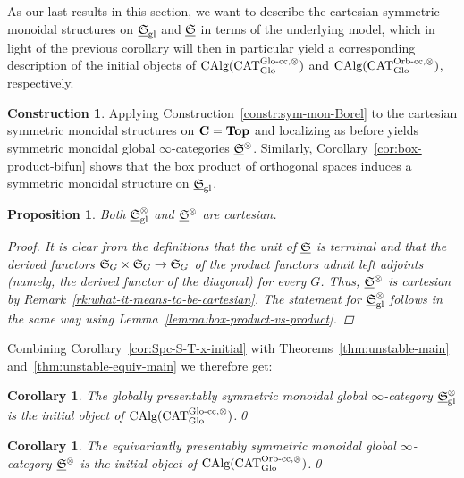 \documentclass[reqno]{memo-l}
\theoremstyle{mythm}
\newtheorem{cor}[thm]{Corollary}
\newtheorem{prop}[thm]{Proposition}
\theoremstyle{definition}
\newtheorem{constr}[thm]{Construction}
\numberwithin{equation}{section}
\newcommand{\gl}{\textup{gl}}
\DeclareMathOperator{\CAT}{CAT}
\newcommand{\cat}[1]{\textbf{\textup{#1}}}
\DeclareMathOperator{\CAlg}{\textup{CAlg}}
\newcommand{\Orb}{{\vphantom{\textup{t}}\smash{\textup{Orb}}}}
\newcommand{\Glo}{\textup{Glo}}
\newcommand{\ulhelper}[2]{\underline{\setbox0=\hbox{$#1#2$}\dp0=0.4pt \box0\relax}}
\newcommand{\ul}[1]{{\mathpalette\ulhelper{#1}}\hbox{\rule[-2pt]{0pt}{0pt}}}
\newcommand{\myS}{{{\mathfrak S\kern-.4pt}}}
\begin{document}
As our last results in this section, we want to describe the cartesian symmetric monoidal structures on $\ul\myS_\gl$ and $\ul\myS$ in terms of the underlying model, which in light of the previous corollary will then in particular yield a corresponding description of the initial objects of $\CAlg(\CAT_\Glo^{\text{$\Glo$-cc},\otimes})$ and $\CAlg(\CAT_\Glo^{\text{$\Orb$-cc},\otimes})$, respectively.

\begin{constr}
    Applying Construction~\ref{constr:sym-mon-Borel} to the cartesian symmetric monoidal structures on $\cat{C}=\cat{Top}$ and localizing as before yields symmetric monoidal global $\infty$-categories $\ul\myS^\otimes$. Similarly, Corollary~\ref{cor:box-product-bifun} shows that the box product of orthogonal spaces induces a symmetric monoidal structure on $\ul\myS_\gl$.
\end{constr}

\begin{prop}
    Both $\ul\myS_\gl^\otimes$ and $\ul\myS^\otimes$ are cartesian.
    \begin{proof}
        It is clear from the definitions that the unit of $\ul\myS$ is terminal and that the derived functors $\myS_G\times\myS_G\to\myS_G$ of the product functors admit left adjoints (namely, the derived functor of the diagonal) for every $G$. Thus, $\ul\myS^\otimes$ is cartesian by Remark~\ref{rk:what-it-means-to-be-cartesian}. The statement for $\ul\myS_\gl^\otimes$ follows in the same way using Lemma~\ref{lemma:box-product-vs-product}.
    \end{proof}
\end{prop}

Combining Corollary~\ref{cor:Spc-S-T-x-initial} with Theorems~\ref{thm:unstable-main} and~\ref{thm:unstable-equiv-main} we therefore get:

\begin{cor}\label{cor:S-gl-times-initial}
    The globally presentably symmetric monoidal global $\infty$-category $\ul\myS_\gl^\otimes$ is the initial object of $\CAlg(\CAT_\Glo^{\textup{$\Glo$-cc},\otimes})$.\qed
\end{cor}

\begin{cor}\label{cor:S-equiv-times-initial}
    The equivariantly presentably symmetric monoidal global $\infty$-category $\ul\myS^\otimes$ is the initial object of $\CAlg(\CAT_\Glo^{\textup{$\Orb$-cc},\otimes})$.\qed
\end{cor}
\end{document}
